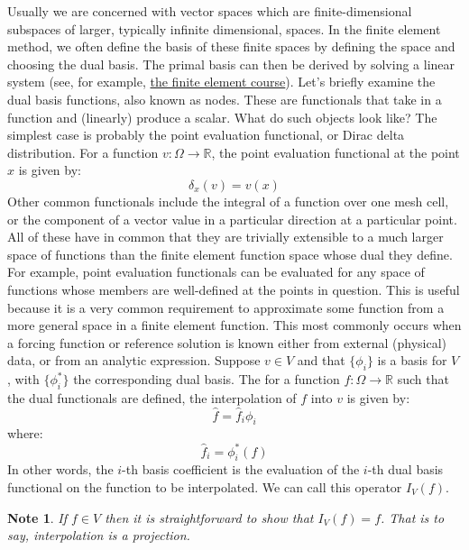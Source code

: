 \documentclass[a4paper,11pt]{article}
\newtheorem{note}{Note}[section]
\begin{document}
Usually we are concerned with vector spaces which are finite-dimensional subspaces of larger, typically infinite dimensional, spaces. In the finite element method, we often define the basis of these finite spaces by defining the space and choosing the dual basis. The primal basis can then be derived by solving a linear system (see, for example, \href{https://finite-element.github.io/2_finite_elements.html}{the finite element course}). Let's briefly examine the dual basis functions, also known as nodes. These are functionals that take in a function and (linearly) produce a scalar. What do such objects look like? The simplest case is probably the point evaluation functional, or Dirac delta distribution. For a function $v: \Omega\rightarrow\mathbb{R}$, the point evaluation functional at the point $x$ is given by:
\begin{equation}
    \delta_x(v) = v(x)
\end{equation}
Other common functionals include the integral of a function over one mesh cell, or the component of a vector value in a particular direction at a particular point. All of these have in common that they are trivially extensible to a much larger space of functions than the finite element function space whose dual they define. For example, point evaluation functionals can be evaluated for any space of functions whose members are well-defined at the points in question. This is useful because it is a very common requirement to approximate some function from a more general space in a finite element function. This most commonly occurs when a forcing function or reference solution is known either from external (physical) data, or from an analytic expression. Suppose $v\in V$ and that $\{\phi_i\}$ is a basis for $V$, with $\{\phi_i^*\}$ the corresponding dual basis. The for a function $f:\Omega\rightarrow\mathbb{R}$ such that the dual functionals are defined, the interpolation of $f$ into $v$ is given by:
\begin{equation}
    \hat{f} = \hat{f}_i \phi_i 
\end{equation}
where:
\begin{equation}
    \hat{f}_i = \phi_i^*(f)
\end{equation}
In other words, the $i$-th basis coefficient is the evaluation of the $i$-th dual basis functional on the function to be interpolated. We can call this operator $I_V(f)$.
\begin{note}
    If $f\in V$ then it is straightforward to show that $I_V(f)=f$. That is to say, interpolation is a projection.
\end{note}
\end{document}
